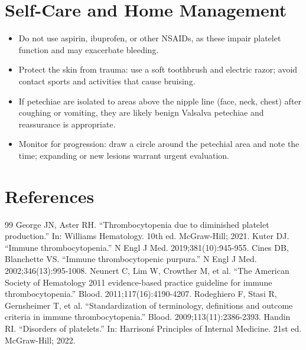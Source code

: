 \section*{Self-Care and Home Management}
\begin{itemize}
  \item Do not use aspirin, ibuprofen, or other NSAIDs, as these impair platelet function and may exacerbate bleeding.
  \item Protect the skin from trauma: use a soft toothbrush and electric razor; avoid contact sports and activities that cause bruising.
  \item If petechiae are isolated to areas above the nipple line (face, neck, chest) after coughing or vomiting, they are likely benign Valsalva petechiae and reassurance is appropriate.
  \item Monitor for progression: draw a circle around the petechial area and note the time; expanding or new lesions warrant urgent evaluation.
\end{itemize}

\section*{References}
\begin{thebibliography}{99}
 George JN, Aster RH. ``Thrombocytopenia due to diminished platelet production.'' In: Williams Hematology. 10th ed. McGraw-Hill; 2021.
 Kuter DJ. ``Immune thrombocytopenia.'' N Engl J Med. 2019;381(10):945-955.
 Cines DB, Blanchette VS. ``Immune thrombocytopenic purpura.'' N Engl J Med. 2002;346(13):995-1008.
 Neunert C, Lim W, Crowther M, et al. ``The American Society of Hematology 2011 evidence-based practice guideline for immune thrombocytopenia.'' Blood. 2011;117(16):4190-4207.
 Rodeghiero F, Stasi R, Gernsheimer T, et al. ``Standardization of terminology, definitions and outcome criteria in immune thrombocytopenia.'' Blood. 2009;113(11):2386-2393.
 Handin RI. ``Disorders of platelets.'' In: Harrison\'s Principles of Internal Medicine. 21st ed. McGraw-Hill; 2022.
\end{thebibliography}
